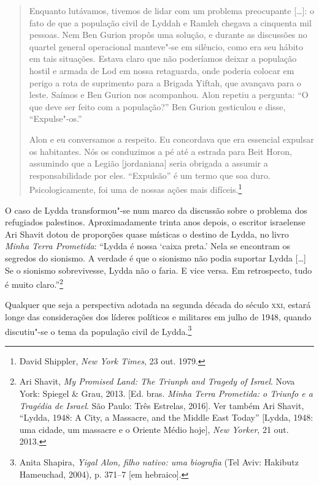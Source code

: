\begin{quote}
Enquanto lutávamos, tivemos de lidar com um problema preocupante {[}\ldots{}{]}: o
fato de que a população civil de Lyddah e Ramleh chegava a cinquenta mil
pessoas. Nem Ben Gurion propôs uma solução, e durante as discussões no
quartel general operacional manteve"-se em silêncio, como era seu hábito
em tais situações. Estava claro que não poderíamos deixar a população
hostil e armada de Lod em nossa retaguarda, onde poderia colocar em
perigo a rota de suprimento para a Brigada Yiftah, que avançava para o
leste. Saímos e Ben Gurion nos acompanhou. Alon repetiu a pergunta: ``O
que deve ser feito com a população?'' Ben Gurion gesticulou e disse, %
``Expulse"-os.''

Alon e eu conversamos a respeito. Eu concordava que era essencial
expulsar os habitantes. Nós os conduzimos a pé até a estrada para Beit
Horon, assumindo que a Legião {[}jordaniana{]} seria obrigada a assumir a
responsabilidade por eles. ``Expulsão'' é um termo que soa duro.
Psicologicamente, foi uma de nossas ações mais difíceis.\footnote{David Shippler, \textit{New York Times}, 23 out. 1979.}
\end{quote}

O caso de Lydda transformou"-se num marco da discussão sobre o problema
dos refugiados palestinos. Aproximadamente trinta anos depois, o escritor
israelense Ari Shavit dotou de proporções quase místicas o destino de
	Lydda, no livro \textit{Minha Terra Prometida}: ``Lydda é nossa `caixa
	preta.' Nela se encontram os segredos do sionismo. A verdade é que o
	sionismo não podia suportar Lydda {[}\ldots{}{]} Se o sionismo sobrevivesse, Lydda
não o faria. E vice versa. Em retrospecto, tudo é muito
claro.''\footnote{Ari Shavit, \textit{My Promised Land: The Triunph and Tragedy of Israel}. Nova York: Spiegel \& Grau, 2013. {[}Ed. bras. \textit{Minha Terra Prometida: o Triunfo e a Tragédia de Israel}. São Paulo: Três Estrelas, 2016{]}. Ver também Ari Shavit, ``Lydda, 1948: A City,
a Massacre, and the Middle East Today'' [Lydda, 1948: uma cidade, um massacre e o Oriente Médio hoje],
\textit{New Yorker}, 21 out. 2013.}

Qualquer que seja a perspectiva adotada na segunda década do século \textsc{xxi},
estará longe das considerações dos líderes políticos e militares em
julho de 1948, quando discutiu"-se o tema da população civil de
Lydda.\footnote{Anita Shapira, \textit{Yigal Alon, filho nativo: uma biografia} (Tel Aviv:
Hakibutz Hameuchad, 2004), p. 371--7 {[}em hebraico{]}.}

